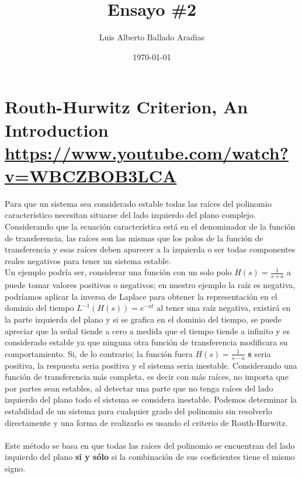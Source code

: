 \documentclass[
	12pt, %
]{fphw}
\title{Ensayo \#2} %
\author{Luis Alberto Ballado Aradias} %
\date{\today} %
\institute{Centro de Investigación y de Estudios Avanzados del IPN \\ Unidad Tamaulipas} %
\begin{document}
\maketitle %

\section*{{\color{Apricot}Routh-Hurwitz Criterion, An Introduction} \url{https://www.youtube.com/watch?v=WBCZBOB3LCA}}

Para que un sistema sea considerado estable todas las raíces del polinomio característico necesitan situarse del lado izquierdo del plano complejo. \\
Considerando que la ecuación característica está en el denominador de la función de transferencia, las raíces son las mismas que los polos de la función de transferencia y esas raíces deben aparecer a la izquierda o ser todas componentes reales negativos para tener un sistema estable. \\
Un ejemplo podría ser, considerar una función con un solo polo $H(s) = \frac{1}{s+a}$ a puede tomar valores positivos o negativos; en nuestro ejemplo la raíz es negativa, podríamos aplicar la inversa de Laplace para obtener la representación en el dominio del tiempo ${L}^{-1} (H(s)) = e^{-at}$ al tener una raíz negativa, existirá en la parte izquierda del plano y si se grafica en el dominio del tiempo, se puede apreciar que la señal tiende a cero a medida que el tiempo tiende a infinito y es considerado estable ya que ninguna otra función de transferencia modificara su comportamiento. Si, de lo contrario; la función fuera $H(s)=\frac{1}{s-a}$  \textbf{s} seria positiva, la respuesta seria positiva y el sistema seria inestable.
Considerando una función de transferencia más completa, es decir con más raíces, no importa que por partes sean estables, al detectar una parte que no tenga raíces del lado izquierdo del plano todo el sistema se considera inestable.
Podemos determinar la estabilidad de un sistema para cualquier grado del polinomio sin resolverlo directamente y una forma de realizarlo es usando el criterio de Routh-Hurwitz. \\\\
Este método se basa en que todas las raíces del polinomio se encuentran del lado izquierdo del plano \textbf{si y sólo} si la combinación de sus coeficientes tiene el mismo signo. \\
\end{document}
